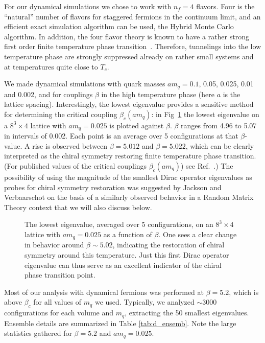 \documentclass[11pt]{article}
\newcommand{\noi}{\vspace{12pt}\noindent}
\begin{document}
For our dynamical simulations we chose to work with $n_f=4$ flavors.
Four is the ``natural'' number of flavors for staggered fermions
in the continuum limit, and an efficient exact simulation algorithm
can be used, the Hybrid Monte Carlo algorithm. In addition, the
four flavor theory is known to have a rather strong first order finite
temperature phase transition~\cite{Brown}. Therefore, tunnelings
into the low temperature phase are strongly suppressed already on
rather small systems and at temperatures quite close to $T_c$.

\noi
We made dynamical simulations with quark masses $am_q = 0.1$, 0.05,
0.025, 0.01 and 0.002, and for couplings
$\beta$ in the high temperature phase (here $a$ is the lattice
spacing). 
Interestingly, the lowest eigenvalue provides a sensitive method for
determining the critical coupling $\beta_c(am_q)$:
in Fig~\ref{fig:1.eig_vs_beta} the lowest eigenvalue on a 
$8^3\times4$ lattice with $am_q=0.025$ is plotted against $\beta$.
$\beta$ ranges from 4.96 to 5.07 in intervals of 0.002.
Each point is an average over 5 configurations at that $\beta$-value.
A rise is observed between $\beta=5.012$ and $\beta=5.022$, which can
be clearly interpreted as the chiral symmetry restoring finite
temperature phase transition.
(For published values of the critical couplings $\beta_c(am_q)$)
see Ref.~\cite{Brown}.) The possibility of using the magnitude of the
smallest Dirac operator eigenvalues as probes for chiral symmetry
restoration was suggested by Jackson and Verbaarschot \cite{JV} on the
basis of a similarly observed behavior in a Random Matrix Theory context
that we will also discuss below. 

\begin{figure}
\begin{center}
\textwidth
{}
\end{center}
\vspace*{-2mm}
\caption[a]{The lowest eigenvalue, averaged over 5 configurations, on an
$8^3 \times 4$ lattice with $am_q=0.025$ as a function of $\beta$.
One sees a clear change in behavior around $\beta \sim 5.02$, indicating
the restoration of chiral symmetry around this temperature. Just this first
Dirac operator eigenvalue can thus serve as an excellent indicator of
the chiral phase transition point. }
\label{fig:1.eig_vs_beta}
\end{figure}

\noi
Most of our analysis with dynamical fermions was performed
at $\beta=5.2$, which is above $\beta_c$ for all values of $m_q$
we used.  Typically, we analyzed $\sim 3000$ configurations for each
volume and $m_q$, extracting the 50 smallest eigenvalues. Ensemble details
are summarized in Table \ref{tab:d_ensemb}. Note the large statistics
gathered for $\beta=5.2$ and $am_q=0.025$.
\end{document}
